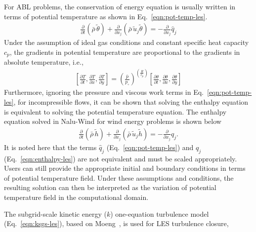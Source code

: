For ABL problems, the conservation of energy equation is usually written in
terms of potential temperature as shown in Eq.~\ref{eqn:pot-temp-les}.
\begin{align}
  \frac{\partial}{\partial t} \left(\bar{\rho}\, \widetilde{\theta}\right) +
  \frac{\partial}{\partial x_j} \left(\bar{\rho}\, \widetilde{u}_j \widetilde{\theta} \right) = - \frac{\partial}{\partial x_j} \hat{q}_j \label{eqn:pot-temp-les}
\end{align}
Under the assumption of ideal gas conditions and constant specific heat capacity
$c_p$, the gradients in potential temperature are proportional to the gradients
in absolute temperature, i.e.,
\begin{align}
   \left[ \frac{\partial T}{\partial t}, \frac{\partial T}{\partial x}, \frac{\partial T}{\partial y} \right] =
   \left( \frac{\bar{p}}{p_\circ} \right)^{\left(\frac{R}{c_p}\right)} \left[ \frac{\partial \theta}{\partial t}, \frac{\partial \theta}{\partial x}, \frac{\partial \theta}{\partial y} \right]
\end{align}
Furthermore, ignoring the pressure and viscous work terms in
Eq.~\ref{eqn:pot-temp-les}, for incompressible flows, it can be shown that
solving the enthalpy equation is equivalent to solving the potential temperature
equation. The enthalpy equation solved in Nalu-Wind for wind energy problems is
shown below
\begin{align}
  \frac{\partial}{\partial t} \left(\bar{\rho}\, \widetilde{h}\right) +
  \frac{\partial}{\partial x_j} \left(\bar{\rho}\, \widetilde{u}_j \widetilde{h} \right) = - \frac{\partial}{\partial x_j} q_j . \label{eqn:enthalpy-les}
\end{align}
It is noted here that the terms $\hat{q}_j$ (Eq.~\ref{eqn:pot-temp-les}) and
$q_j$ (Eq.~\ref{eqn:enthalpy-les}) are not equivalent and must be scaled
appropriately. Users can still provide the appropriate initial and boundary
conditions in terms of potential temperature field. Under these assumptions and
conditions, the resulting solution can then be interpreted as the variation of
potential temperature field in the computational domain.

The subgrid-scale kinetic energy ($k$) one-equation turbulence model
(Eq.~\ref{eqn:ksgs-les}), based on Moeng~\cite{Moeng1984}, is used for
LES turbulence closure,

